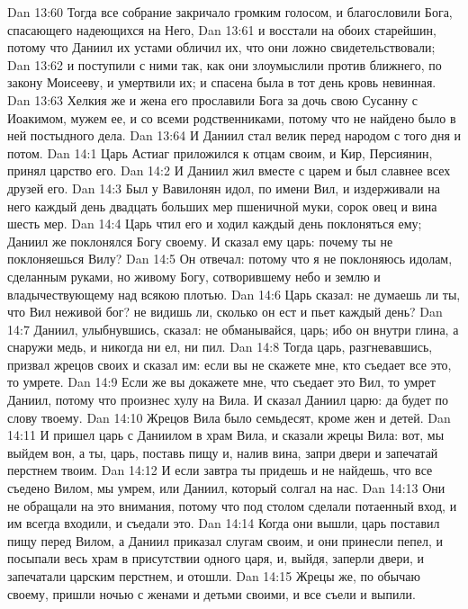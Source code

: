 \vs Dan 13:60 Тогда все собрание закричало громким голосом, и благословили Бога, спасающего надеющихся на Него,
\vs Dan 13:61 и восстали на обоих старейшин, потому что Даниил их устами обличил их, что они ложно свидетельствовали;
\vs Dan 13:62 и поступили с ними так, как они злоумыслили против ближнего, по закону Моисееву, и умертвили их; и спасена была в тот день кровь невинная.
\vs Dan 13:63 Хелкия же и жена его прославили Бога за дочь свою Сусанну с Иоакимом, мужем ее, и со всеми родственниками, потому что не найдено было в ней постыдного дела.
\vs Dan 13:64 И Даниил стал велик перед народом с того дня и потом.
\vs Dan 14:1 Царь Астиаг приложился к отцам своим, и Кир, Персиянин, принял царство его.
\vs Dan 14:2 И Даниил жил вместе с царем и был славнее всех друзей его.
\vs Dan 14:3 Был у Вавилонян идол, по имени Вил, и издерживали на него каждый день двадцать больших мер пшеничной муки, сорок овец и вина шесть мер.
\vs Dan 14:4 Царь чтил его и ходил каждый день поклоняться ему; Даниил же поклонялся Богу своему. И сказал ему царь: почему ты не поклоняешься Вилу?
\vs Dan 14:5 Он отвечал: потому что я не поклоняюсь идолам, сделанным руками, но  живому Богу, сотворившему небо и землю и владычествующему над всякою плотью.
\vs Dan 14:6 Царь сказал: не думаешь ли ты, что Вил неживой бог? не видишь ли, сколько он ест и пьет каждый день?
\vs Dan 14:7 Даниил, улыбнувшись, сказал: не обманывайся, царь; ибо он внутри глина, а снаружи медь, и никогда ни ел, ни пил.
\vs Dan 14:8 Тогда царь, разгневавшись, призвал жрецов своих и сказал им: если вы не скажете мне, кто съедает все это, то умрете.
\vs Dan 14:9 Если же вы докажете мне, что съедает это Вил, то умрет Даниил, потому что произнес хулу на Вила. И сказал Даниил царю: да будет по слову твоему.
\vs Dan 14:10 Жрецов Вила было семьдесят, кроме жен и детей.
\vs Dan 14:11 И пришел царь с Даниилом в храм Вила, и сказали жрецы Вила: вот, мы выйдем вон, а ты, царь, поставь пищу и, налив вина, запри двери и запечатай перстнем твоим.
\vs Dan 14:12 И если завтра ты придешь и не найдешь, что все съедено Вилом, мы умрем, или Даниил, который солгал на нас.
\vs Dan 14:13 Они не обращали на это внимания, потому что под столом сделали потаенный вход, и им всегда входили, и съедали это.
\vs Dan 14:14 Когда они вышли, царь поставил пищу перед Вилом, а Даниил приказал слугам своим, и они принесли пепел, и посыпали весь храм в присутствии одного царя, и, выйдя, заперли двери, и запечатали царским перстнем, и отошли.
\vs Dan 14:15 Жрецы же, по обычаю своему, пришли ночью с женами и детьми своими, и все съели и выпили.
